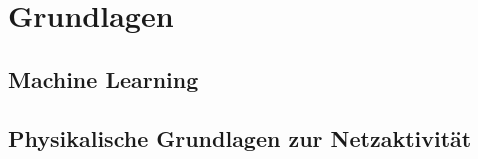 \chapter{Grundlagen}

\section{Machine Learning}

\section{Physikalische Grundlagen zur Netzaktivität} \label{physikalischeGrundlagen}